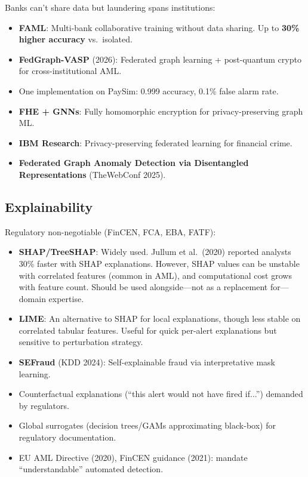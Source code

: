 \documentclass[11pt]{article}
\begin{document}
Banks can't share data but laundering spans institutions:
\begin{itemize}
\item \textbf{FAML}: Multi-bank collaborative training without data sharing. Up to \textbf{30\% higher accuracy} vs.\ isolated.
\item \textbf{FedGraph-VASP} (2026): Federated graph learning + post-quantum crypto for cross-institutional AML.
\item One implementation on PaySim: 0.999 accuracy, 0.1\% false alarm rate.
\item \textbf{FHE + GNNs}: Fully homomorphic encryption for privacy-preserving graph ML.
\item \textbf{IBM Research}: Privacy-preserving federated learning for financial crime.
\item \textbf{Federated Graph Anomaly Detection via Disentangled Representations} (TheWebConf 2025).
\end{itemize}

\subsection{Explainability}

Regulatory non-negotiable (FinCEN, FCA, EBA, FATF):
\begin{itemize}
\item \textbf{SHAP/TreeSHAP}: Widely used. Jullum et al.\ (2020) reported analysts 30\% faster with SHAP explanations. However, SHAP values can be unstable with correlated features (common in AML), and computational cost grows with feature count. Should be used alongside---not as a replacement for---domain expertise.
\item \textbf{LIME}: An alternative to SHAP for local explanations, though less stable on correlated tabular features. Useful for quick per-alert explanations but sensitive to perturbation strategy.
\item \textbf{SEFraud} (KDD 2024): Self-explainable fraud via interpretative mask learning.
\item Counterfactual explanations (``this alert would not have fired if...'') demanded by regulators.
\item Global surrogates (decision trees/GAMs approximating black-box) for regulatory documentation.
\item EU AML Directive (2020), FinCEN guidance (2021): mandate ``understandable'' automated detection.
\end{itemize}
\end{document}
